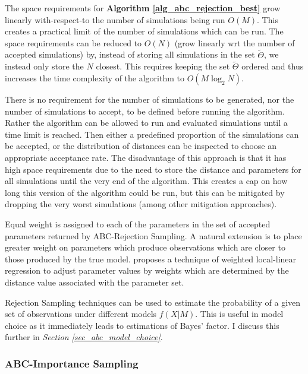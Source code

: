 \documentclass[11pt,a4paper]{article}
\theoremstyle{break}
\begin{document}
  \par The space requirements for \textbf{Algorithm \ref{alg_abc_rejection_best}} grow linearly with-respect-to the number of simulations being run $O(M)$. This creates a practical limit of the number of simulations which can be run. The space requirements can be reduced to $O(N)$ (grow linearly wrt the number of accepted simulations) by, instead of storing all simulations in the set $\tilde\Theta$, we instead only store the $N$ closest. This requires keeping the set $\tilde\Theta$ ordered and thus increases the time complexity of the algorithm to $O(M\log_2 N)$.

  \par There is no requirement for the number of simulations to be generated, nor the number of simulations to accept, to be defined before running the algorithm. Rather the algorithm can be allowed to run and evaluated simulations until a time limit is reached. Then either a predefined proportion of the simulations can be accepted, or the distribution of distances can be inspected to choose an appropriate acceptance rate. The disadvantage of this approach is that it has high space requirements due to the need to store the distance and parameters for all simulations until the very end of the algorithm. This creates a cap on how long this version of the algorithm could be run, but this can be mitigated by dropping the very worst simulations (among other mitigation approaches).

  \par Equal weight is assigned to each of the parameters in the set of accepted parameters returned by ABC-Rejection Sampling. A natural extension is to place greater weight on parameters which produce observations which are closer to those produced by the true model. \cite[]{ABC_in_population_genetics} proposes a technique of weighted local-linear regression to adjust parameter values by weights which are determined by the distance value associated with the parameter set.

  \par Rejection Sampling techniques can be used to estimate the probability of a given set of observations under different models $f(X|M)$. This is useful in model choice as it immediately leads to estimations of Bayes' factor. I discuss this further in \textit{Section \ref{sec_abc_model_choice}}.

\subsubsection{ABC-Importance Sampling}\label{sec_abc_importance_sampling}
\end{document}
